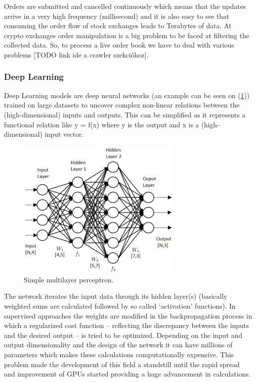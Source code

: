 \documentclass[11pt,a4paper,oneside]{article}
\begin{document}
  Orders are submitted and cancelled continuously which means that the updates arrive in a very high frequency 
  (millisecond) and it is also easy to see that consuming the order flow of stock exchanges leads to Terabytes of data. 
  At crypto exchanges order manipulation is a big problem to be faced at filtering the collected data. So, to process a 
  live order book we have to deal with various problems [TODO link ide a crawler szekcióhoz].

  \subsubsection{Deep Learning}
  \label{sec:deep_learning}

  Deep Learning models are deep neural networks (an example can be seen on (\ref{fig:2})) trained on large datasets to 
  uncover complex non-linear relations between the (high-dimensional) inputs and outputs. This can be simplified as it 
  represents a functional relation like y = f(x) where y is the output and x is a (high-dimensional) input vector.

  \begin{figure}[tbh]
    \centering
    \includegraphics[width=8cm]{mlp.png}
    \caption{Simple multilayer perceptron.}
    \label{fig:2}
  \end{figure}

  The network iterates the input data through its hidden layer(s) (basically weighted sums are calculated followed by 
  so called ‘activation’ functions). In supervised approaches the weights are modified in the backpropagation process 
  in which a regularized cost function – reflecting the discrepancy between the inputs and the desired output – is tried 
  to be optimized. Depending on the input and output dimensionality and the design of the network it can have millions 
  of parameters which makes these calculations computationally expensive. This problem made the development of this 
  field a standstill until the rapid spread and improvement of GPUs started providing a huge advancement in 
  calculations.
\end{document}

